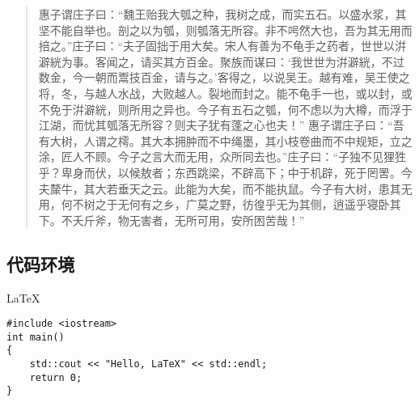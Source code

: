 \documentclass[utf8]{book}
\begin{document}
\begin{quotation}
			惠子谓庄子曰：“魏王贻我大瓠之种，我树之成，而实五石。以盛水浆，其坚不能自举也。剖之以为瓠，则瓠落无所容。非不呺然大也，吾为其无用而掊之。”庄子曰：“夫子固拙于用大矣。宋人有善为不龟手之药者，世世以洴澼絖为事。客闻之，请买其方百金。聚族而谋曰：‘我世世为洴澼絖，不过数金，今一朝而鬻技百金，请与之。’客得之，以说吴王。越有难，吴王使之将，冬，与越人水战，大败越人。裂地而封之。能不龟手一也，或以封，或不免于洴澼絖，则所用之异也。今子有五石之瓠，何不虑以为大樽，而浮于江湖，而忧其瓠落无所容？则夫子犹有蓬之心也夫！”
			惠子谓庄子曰：“吾有大树，人谓之樗。其大本拥肿而不中绳墨，其小枝卷曲而不中规矩，立之涂，匠人不顾。今子之言大而无用，众所同去也。”庄子曰：“子独不见狸狌乎？卑身而伏，以候敖者；东西跳梁，不辟高下；中于机辟，死于罔罟。今夫斄牛，其大若垂天之云。此能为大矣，而不能执鼠。今子有大树，患其无用，何不树之于无何有之乡，广莫之野，彷徨乎无为其侧，逍遥乎寝卧其下。不夭斤斧，物无害者，无所可用，安所困苦哉！”
		\end{quotation}
	\subsection{代码环境}LaTeX
		\begin{verbatim}
#include <iostream>
int main()
{
	std::cout << "Hello, LaTeX" << std::endl;
	return 0;
}
		\end{verbatim}
	

	\backmatter
		
	\appendix
	
\end{document}
